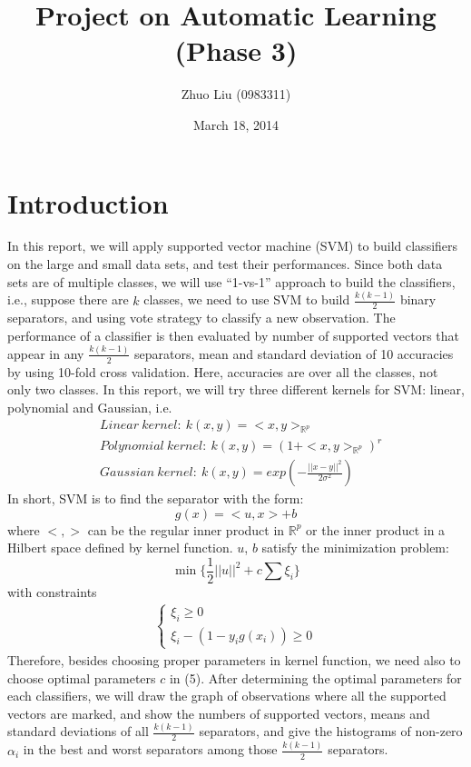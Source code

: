 \documentclass{article}
\author{Zhuo Liu (0983311)}
\title{Project on Automatic Learning (Phase 3)}
\date{March 18, 2014}
\begin{document}
\maketitle


\section{Introduction}

In this report, we will apply supported vector machine (SVM) to build classifiers on the large and small data sets, and test their performances. Since both data sets are of multiple classes, we will use ``1-vs-1'' approach to build the classifiers, i.e., suppose there are $k$ classes, we need to use SVM to build $\frac{k(k-1)}{2}$ binary separators, and using vote strategy to classify a new observation. The performance of a classifier is then evaluated by number of supported vectors that appear in any $\frac{k(k-1)}{2}$ separators, mean and standard deviation of 10 accuracies by using 10-fold cross validation. Here, accuracies are over all the classes, not only two classes. In this report, we will try three different kernels for SVM: linear, polynomial and Gaussian, i.e.
\begin{align}
 & Linear\ kernel:\ k(x,y) = <x,y>_{\mathbb{R}^{p}} \\
 & Polynomial\ kernel:\ k(x,y) = (1+<x,y>_{\mathbb{R}^{p}})^{r} \\
 & Gaussian\ kernel:\ k(x,y) = exp(-\frac{||x-y||^{2}}{2\sigma^{2}})
\end{align}
In short, SVM is to find the separator with the form:
\begin{equation}
 g(x) = <u,x> + b
\end{equation}
where $<,>$ can be the regular inner product in $\mathbb{R}^{p}$ or the inner product in a Hilbert space defined by kernel function. $u$, $b$ satisfy the minimization problem:
\begin{equation}
 \min\{\frac{1}{2}||u||^{2} + c\sum \xi_{i}\}
\end{equation}
with constraints
\begin{align}
 \begin{cases}
  \xi_{i} \geq 0 \\
  \xi_{i}-(1-y_{i}g(x_{i})) \geq 0
 \end{cases}
\end{align}
Therefore, besides choosing proper parameters in kernel function, we need also to choose optimal parameters $c$ in (5). After determining the optimal parameters for each classifiers, we will draw the graph of observations where all the supported vectors are marked, and show the numbers of supported vectors, means and standard deviations of all $\frac{k(k-1)}{2}$ separators, and give the histograms of non-zero $\alpha_{i}$ in the best and worst separators among those $\frac{k(k-1)}{2}$ separators.
\end{document}
